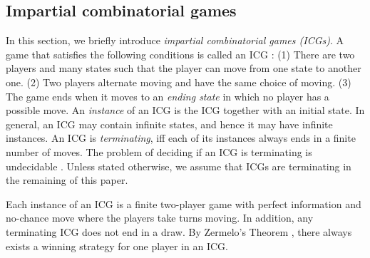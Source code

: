 \documentclass[review]{elsarticle}
\begin{document}
	\subsection{Impartial combinatorial games}	
	In this section, we briefly introduce \textit{impartial combinatorial games (ICGs)}.
	A game that satisfies the following conditions is called an ICG \cite{Fer2018}:
	(1) There are two players and many states such that the player can move from one state to another one.
	(2) Two players alternate moving and have the same choice of moving.		
	(3) The game ends when it moves to an \textit{ending state} in which no player has a possible move. 
	An \textit{instance} of an ICG is the ICG together with an initial state.
	In general, an ICG may contain infinite states, and hence it may have infinite instances.
%	
	An ICG is \textit{terminating}, iff each of its instances always ends in a finite number of moves.
	The problem of deciding if an ICG is terminating is undecidable \cite{FengFLG2026}.
	Unless stated otherwise, we assume that ICGs are terminating in the remaining of this paper.
	
	
	
	Each instance of an ICG is a finite two-player game with perfect information and no-chance move where the players take turns moving.
	In addition, any terminating ICG does not end in a draw. 
	By Zermelo’s Theorem \cite{Zer1913}, there always exists a winning strategy for one player in an ICG.
	
\end{document}
